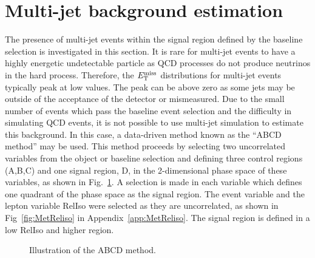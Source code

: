 \section{Multi-jet background estimation}
\label{sec:QCDbackground}
The presence of multi-jet events within the signal region defined by the baseline selection is investigated in this section. It is rare for multi-jet events to have a highly energetic undetectable particle as QCD processes do not produce neutrinos in the hard process. Therefore, the $E_{\mathrm{T}}^{\text{miss}}$ distributions for multi-jet events typically peak at low values. The peak can be above zero as some jets may be outside of the acceptance of the detector or mismeasured. Due to the small number of events which pass the baseline event selection and the difficulty in simulating QCD events, it is not possible to use multi-jet simulation to estimate this background. In this case, a data-driven method known as the ``ABCD method'' may be used. This method proceeds by selecting two uncorrelated variables from the object or baseline selection and defining three control regions (A,B,C) and one signal region, D, in the 2-dimensional phase space of these variables, as shown in Fig.~\ref{fig:ABCDdiagram}. A selection is made in each variable which defines one quadrant of the phase space as the signal region.  The event variable \MET and the lepton variable RelIso were selected as they are uncorrelated, as shown in Fig~\ref{fig:MetReliso} in Appendix~\ref{app:MetReliso}. The signal region is defined in a low RelIso and higher \MET region.\\

\begin{figure}[ht!]
\begin{center}
\hspace{0.2cm}
\end{center}
\caption{Illustration of the ABCD method.}
\label{fig:ABCDdiagram}
\end{figure}

